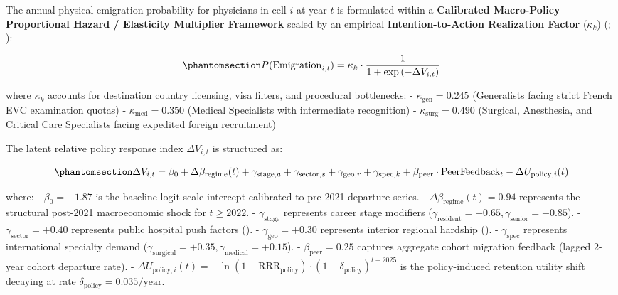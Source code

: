 \documentclass[
  11pt,
  a4paper]{article}
\begin{document}
The annual physical emigration probability for physicians in cell \(i\)
at year \(t\) is formulated within a \textbf{Calibrated Macro-Policy
Proportional Hazard / Elasticity Multiplier Framework} scaled by an
empirical \textbf{Intention-to-Action Realization Factor} (\(\kappa_k\))
(;
):

\begin{equation}\protect\phantomsection\label{eq-emigration-prob}{P(\text{Emigration}_{i,t}) = \kappa_k \cdot \frac{1}{1 + \exp\left(-\Delta V_{i,t}\right)}}\end{equation}

where \(\kappa_k\) accounts for destination country licensing, visa
filters, and procedural bottlenecks: - \(\kappa_{\text{gen}} = 0.245\)
(Generalists facing strict French EVC examination quotas) -
\(\kappa_{\text{med}} = 0.350\) (Medical Specialists with intermediate
recognition) - \(\kappa_{\text{surg}} = 0.490\) (Surgical, Anesthesia,
and Critical Care Specialists facing expedited foreign recruitment)

The latent relative policy response index \(\Delta V_{i,t}\) is
structured as:

\begin{equation}\protect\phantomsection\label{eq-latent-utility}{\Delta V_{i,t} = \beta_0 + \Delta \beta_{\text{regime}}(t) + \gamma_{\text{stage}, a} + \gamma_{\text{sector}, s} + \gamma_{\text{geo}, r} + \gamma_{\text{spec}, k} + \beta_{\text{peer}} \cdot \text{PeerFeedback}_t - \Delta U_{\text{policy}, i}(t)}\end{equation}

where: - \(\beta_0 = -1.87\) is the baseline logit scale intercept
calibrated to pre-2021 departure series. -
\(\Delta \beta_{\text{regime}}(t) = 0.94\) represents the structural
post-2021 macroeconomic shock for \(t \ge 2022\). -
\(\gamma_{\text{stage}}\) represents career stage modifiers
(\(\gamma_{\text{resident}} = +0.65, \gamma_{\text{senior}} = -0.85\)).
- \(\gamma_{\text{sector}} = +0.40\) represents public hospital push
factors (). -
\(\gamma_{\text{geo}} = +0.30\) represents interior regional hardship
(). - \(\gamma_{\text{spec}}\) represents international specialty
demand
(\(\gamma_{\text{surgical}} = +0.35, \gamma_{\text{medical}} = +0.15\)).
- \(\beta_{\text{peer}} = 0.25\) captures aggregate cohort migration
feedback (lagged 2-year cohort departure rate). -
\(\Delta U_{\text{policy}, i}(t) = -\ln(1 - \text{RRR}_{\text{policy}}) \cdot (1 - \delta_{\text{policy}})^{t - 2025}\)
is the policy-induced retention utility shift decaying at rate
\(\delta_{\text{policy}} = 0.035/\text{year}\).
\end{document}
